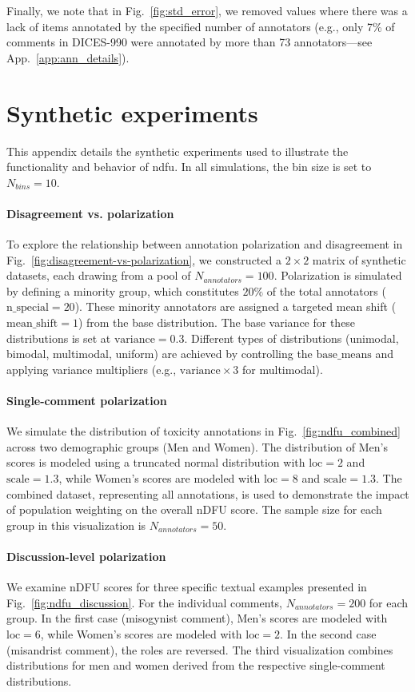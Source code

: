\documentclass[11pt]{article}
\theoremstyle{definition}
\theoremstyle{plain}
\begin{document}
Finally, we note that in Fig.~\ref{fig:std_error}, we removed values where there was a lack of items annotated by the specified number of annotators (e.g., only 7\% of comments in DICES-990 were annotated by more than 73 annotators---see App.~\ref{app:ann_details}).


\section{Synthetic experiments}
\label{app:experiments}

This appendix details the synthetic experiments used to illustrate the functionality and behavior of \ac{ndfu}. In all simulations, the bin size is set to $N_{bins}=10$.

\paragraph{Disagreement vs. polarization}
To explore the relationship between annotation polarization and disagreement in Fig.~\ref{fig:disagreement-vs-polarization}, we constructed a $2 \times 2$ matrix of synthetic datasets, each drawing from a pool of $N_{annotators}=100$. Polarization is simulated by defining a minority group, which constitutes $20\%$ of the total annotators ($\text{n\_special}=20$). These minority annotators are assigned a targeted mean shift ($\text{mean\_shift}=1$) from the base distribution. The base variance for these distributions is set at $\text{variance}=0.3$. Different types of distributions (unimodal, bimodal, multimodal, uniform) are achieved by controlling the $\text{base\_means}$ and applying variance multipliers (e.g., $\text{variance} \times 3$ for multimodal).

\paragraph{Single-comment polarization}
We simulate the distribution of toxicity annotations in Fig.~\ref{fig:ndfu_combined} across two demographic groups (Men and Women). The distribution of Men's scores is modeled using a truncated normal distribution with $\text{loc}=2$ and $\text{scale}=1.3$, while Women's scores are modeled with $\text{loc}=8$ and $\text{scale}=1.3$. The combined dataset, representing all annotations, is used to demonstrate the impact of population weighting on the overall nDFU score. The sample size for each group in this visualization is $N_{annotators}=50$.

\paragraph{Discussion-level polarization}
We examine nDFU scores for three specific textual examples presented in Fig.~\ref{fig:ndfu_discussion}. For the individual comments, $N_{annotators}=200$ for each group. In the first case (misogynist comment), Men's scores are modeled with $\text{loc}=6$, while Women's scores are modeled with $\text{loc}=2$. In the second case (misandrist comment), the roles are reversed. The third visualization combines distributions for men and women derived from the respective single-comment distributions.
\end{document}
